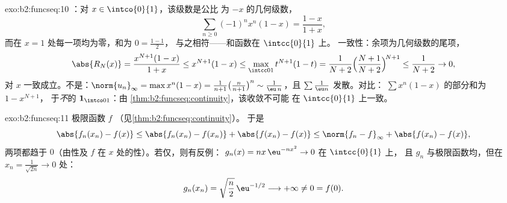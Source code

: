 \begin{solution}{exo:b2:funcseq:10}
：对 $x \in \intco{0}{1}$，该级数是公比
为 $-x$ 的几何级数，
\[
\sum_{n\geq0}(-1)^n x^n(1-x) = \frac{1-x}{1+x},
\]
而在 $x = 1$ 处每一项均为零，和为 $0 = \frac{1-1}{2}$，
与之相符——和函数在 $\intcc{0}{1}$ 上。
一致性：余项为几何级数的尾项，
\[
\abs{R_N(x)} = \frac{x^{N+1}(1-x)}{1+x} \leq x^{N+1}(1 - x)
\leq \max_{\intcc01} t^{N+1}(1-t)
= \frac{1}{N+2}\Bigl(\frac{N+1}{N+2}\Bigr)^{\!N+1}
\leq \frac{1}{N+2} \to 0 ,
\]
对 $x$ 一致成立。不是：$\norm{u_n}_\infty =
\max x^n(1-x) = \frac{1}{n+1}\bigl(\frac{n}{n+1}\bigr)^n \sim
\frac{1}{\eu\,n}$，且 $\sum \frac1{\eu n}$ 发散。对比：
$\sum x^n(1-x)$ 的部分和为 $1 - x^{N+1}$，
于\emph{不}的 $\mathbf 1_{\intco01}$：由
\cref{thm:b2:funcseq:continuity}，该收敛不可能
在 $\intcc{0}{1}$ 上一致。
\end{solution}

\begin{solution}{exo:b2:funcseq:11}
极限函数 $f$ （见\cref{thm:b2:funcseq:continuity}）。
于是
\[
\abs{f_n(x_n) - f(x)}
\leq \abs{f_n(x_n) - f(x_n)} + \abs{f(x_n) - f(x)}
\leq \norm{f_n - f}_\infty + \abs{f(x_n) - f(x)} ,
\]
两项都趋于 $0$（由性及
$f$ 在 $x$ 处的性）。若仅，则有反例：
$g_n(x) = nx\,\eu^{-nx^2} \to 0$ 在 $\intcc{0}{1}$ 上，
且 $g_n$ 与极限函数均，但在 $x_n =
\frac{1}{\sqrt{2n}} \to 0$ 处：
\[
g_n(x_n) = \sqrt{\frac n2}\,\eu^{-1/2} \longrightarrow +\infty
\neq 0 = f(0) .
\]
\end{solution}


